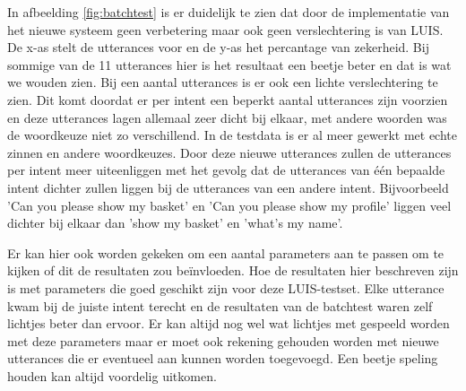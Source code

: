 In afbeelding \ref{fig:batchtest} is er duidelijk te zien dat door de implementatie van het nieuwe systeem geen verbetering maar ook geen verslechtering is van LUIS. De x-as stelt de utterances voor en de y-as het percantage van zekerheid. Bij sommige van de 11 utterances hier is het resultaat een beetje beter en dat is wat we wouden zien. Bij een aantal utterances is er ook een lichte verslechtering te zien. Dit komt doordat er per intent een beperkt aantal utterances zijn voorzien en deze utterances lagen allemaal zeer dicht bij elkaar, met andere woorden was de woordkeuze niet zo verschillend. In de testdata is er al meer gewerkt met echte zinnen en andere woordkeuzes. Door deze nieuwe utterances zullen de utterances per intent meer uiteenliggen met het gevolg dat de utterances van één bepaalde intent dichter zullen liggen bij de utterances van een andere intent. Bijvoorbeeld 'Can you please show my basket' en 'Can you please show my profile' liggen veel dichter bij elkaar dan 'show my basket' en 'what's my name'.

Er kan hier ook worden gekeken om een aantal parameters aan te passen om te kijken of dit de resultaten zou beïnvloeden. Hoe de resultaten hier beschreven zijn is met parameters die goed geschikt zijn voor deze LUIS-testset. Elke utterance kwam bij de juiste intent terecht en de resultaten van de batchtest waren zelf lichtjes beter dan ervoor. Er kan altijd nog wel wat lichtjes met gespeeld worden met deze parameters maar er moet ook rekening gehouden worden met nieuwe utterances die er eventueel aan kunnen worden toegevoegd. Een beetje speling houden kan altijd voordelig uitkomen.


